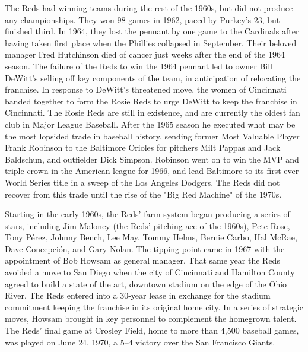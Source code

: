The Reds had winning teams during the rest of the 1960s, but did not
produce any championships. They won 98 games in 1962, paced by Purkey's
23, but finished third. In 1964, they lost the pennant by one game to
the Cardinals after having taken first place when the Phillies collapsed
in September. Their beloved manager Fred Hutchinson died of cancer just
weeks after the end of the 1964 season. The failure of the Reds to win
the 1964 pennant led to owner Bill DeWitt's selling off key components
of the team, in anticipation of relocating the franchise. In response to
DeWitt's threatened move, the women of Cincinnati banded together to
form the Rosie Reds to urge DeWitt to keep the franchise in Cincinnati.
The Rosie Reds are still in existence, and are currently the oldest fan
club in Major League Baseball. After the 1965 season he executed what
may be the most lopsided trade in baseball history, sending former Most
Valuable Player Frank Robinson to the Baltimore Orioles for pitchers
Milt Pappas and Jack Baldschun, and outfielder Dick Simpson. Robinson
went on to win the MVP and triple crown in the American league for 1966,
and lead Baltimore to its first ever World Series title in a sweep of
the Los Angeles Dodgers. The Reds did not recover from this trade until
the rise of the "Big Red Machine" of the 1970s.

Starting in the early 1960s, the Reds' farm system began producing a
series of stars, including Jim Maloney (the Reds' pitching ace of the
1960s), Pete Rose, Tony Pérez, Johnny Bench, Lee May, Tommy Helms,
Bernie Carbo, Hal McRae, Dave Concepción, and Gary Nolan. The tipping
point came in 1967 with the appointment of Bob Howsam as general
manager. That same year the Reds avoided a move to San Diego when the
city of Cincinnati and Hamilton County agreed to build a state of the
art, downtown stadium on the edge of the Ohio River. The Reds entered
into a 30-year lease in exchange for the stadium commitment keeping the
franchise in its original home city. In a series of strategic moves,
Howsam brought in key personnel to complement the homegrown talent. The
Reds' final game at Crosley Field, home to more than 4,500 baseball
games, was played on June 24, 1970, a 5--4 victory over the San
Francisco Giants.


